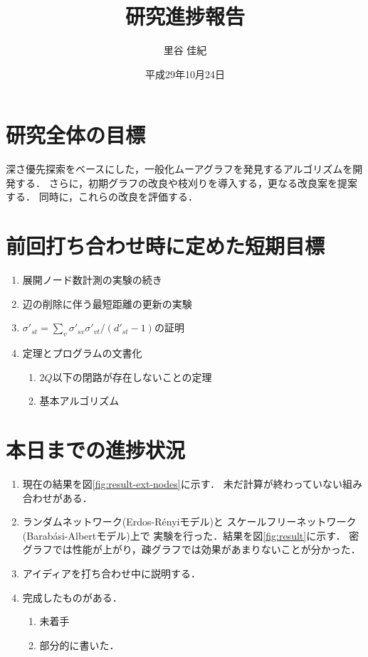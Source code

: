 \documentclass[11pt]{jarticle}
\title{研究進捗報告}
\author{里谷 佳紀}
\date{平成29年10月24日}
\begin{document}
%
\maketitle
\thispagestyle{empty}
%
\section{研究全体の目標}
深さ優先探索をベースにした，一般化ムーアグラフを発見するアルゴリズムを開発する．
さらに，初期グラフの改良や枝刈りを導入する，更なる改良案を提案する．
同時に，これらの改良を評価する．
\section{前回打ち合わせ時に定めた短期目標}
\begin{enumerate}
\item 展開ノード数計測の実験の続き
\item 辺の削除に伴う最短距離の更新の実験
\item $\sigma'_{st}=\sum_v\sigma'_{sv}\sigma'_{vt}/(d'_{st}-1)$の証明
\item 定理とプログラムの文書化
  \begin{enumerate}
  \item $2Q$以下の閉路が存在しないことの定理
  \item 基本アルゴリズム
  \end{enumerate}
\end{enumerate}
\section{本日までの進捗状況}
\begin{enumerate}
\item 現在の結果を図\ref{fig:result-ext-nodes}に示す．
  未だ計算が終わっていない組み合わせがある．
\item ランダムネットワーク(Erdos-R{\'e}nyiモデル)と
  スケールフリーネットワーク(Barab{\'a}si-Albertモデル)上で
  実験を行った．結果を図\ref{fig:result}に示す．
  密グラフでは性能が上がり，疎グラフでは効果があまりないことが分かった．
\item アイディアを打ち合わせ中に説明する．
\item 完成したものがある．
  \begin{enumerate}
  \item 未着手
  \item 部分的に書いた．
  \end{enumerate}
\end{enumerate}
\end{document}
